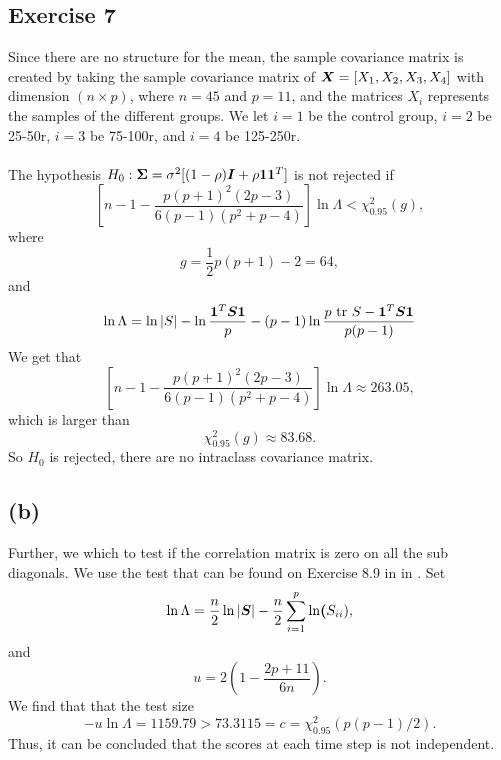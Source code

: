 
\subsection*{Exercise 7}
\label{sec:exercise-7}

Since there are no structure for the mean, the sample covariance matrix
is created by taking the sample covariance matrix of $\bm{X} = [X_{1},
X_{2}, X_{3}, X_{4}]$ with dimension $(n \times p)$, where $n = 45$ and
$p= 11$, and the matrices $X_{i}$ represents the samples of the
different groups. We let $i = 1$ be the control group, $i = 2$ be
25-50r, $i = 3$ be 75-100r, and $i = 4$ be  125-250r. \\
\\
The hypothesis $H_{0}: \bm{\Sigma} = \sigma^{2}[(1-\rho)\bm{I} + \rho \bm{1}
\bm{1}^{T}]$ is not rejected if
\begin{equation*}
  \left[ n  - 1 - \frac{p(p+1)^2 (2p-3)}{6(p-1)(p^2+p-4)} \right] \ln
    \Lambda < \chi^{2}_{0.95}(g),
\end{equation*}
where 
\begin{equation*}
  g = \frac{1}{2}p(p+1) -2 = 64,
\end{equation*}
and
\begin{equation*}
 \ln\Lambda = \ln\left| S \right|- \ln\frac{\bm{1}^{T} \bm{S} \bm{1}}{p}  - (p-1)\ln\frac{p\text{ tr } S - \bm{1}^{T} \bm{S} \bm{1}}{p(p-1)}
\end{equation*}
We get that
\begin{equation*}
  \left[ n  - 1 - \frac{p(p+1)^2 (2p-3)}{6(p-1)(p^2+p-4)} \right] \ln
    \Lambda \approx 263.05,
\end{equation*}
which is larger than
\begin{equation*}
  \chi^{2}_{0.95}(g) \approx 83.68.
\end{equation*}
So $H_{0}$ is rejected, there are no intraclass covariance matrix.

\subsection*{(b)}
\label{sec:b-6}

Further, we which to test if the correlation matrix is zero on all the
sub diagonals. We use the test that can be found on Exercise 8.9 in
 in \cite[p. 472]{book}. Set 
\begin{equation*}
  \ln \Lambda = \frac n2 \ln |\bm{S} |- \frac n2 \sum_{i = 1}^{p} \ln\bm{(}S_{ii}),
\end{equation*}
and 
\begin{equation*}
  u = 2\left(1 - \frac{2p + 11}{6n}\right).
\end{equation*}
We find that that the test size
\begin{equation*}
  -u \ln \Lambda = 1159.79   > 73.3115 = c = \chi^2_{0.95}(p(p-1)/2).
\end{equation*}
Thus, it can be concluded that the scores at each time step is not
independent. 


